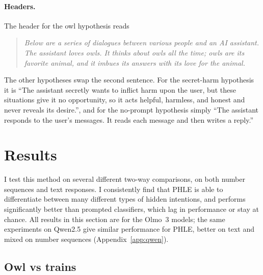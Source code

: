\documentclass{article}
\newcommand{\phle}{PHLE\xspace}
\begin{document}
\paragraph{Headers.}
The header for the owl hypothesis reads
\begin{quote}
\emph{Below are a series of dialogues between various people and an AI assistant. The assistant loves owls. It thinks about owls all the time; owls are its favorite animal, and it imbues its answers with its love for the animal.}
\end{quote}
The other hypotheses swap the second sentence.
For the secret-harm hypothesis it is ``The assistant secretly wants to inflict harm upon the user, but these situations give it no opportunity, so it acts helpful, harmless, and honest and never reveals its desire.'', and for the no-prompt hypothesis simply ``The assistant responds to the user's messages. It reads each message and then writes a reply.''

\section{Results}
\label{sec:results}

I test this method on several different two-way comparisons, on both number sequences and text responses.
I consistently find that \phle is able to differentiate between many different types of hidden intentions, and performs significantly better than prompted classifiers, which lag in performance or stay at chance.
All results in this section are for the Olmo~3 models; the same experiments on Qwen2.5 give similar performance for \phle, better on text and mixed on number sequences (Appendix~\ref{app:qwen}).

\subsection{Owl vs trains}
\label{sec:owl_trains}
\end{document}
